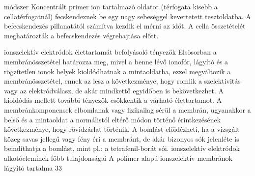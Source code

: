 {{ módszer
Koncentrált primer ion tartalmazó oldatot (térfogata kisebb a cellatérfogatnál) fecskendeznek be egy nagy sebeséggel kevertetett tesztoldatba. A befecskendezés pillanatától számítva kezdik el mérni az időt. A cella összetételét meghatározták a befecskendezés végrehajtása előtt. 

\sectioneAz ionszelektív elektródok élettartamát befolyásoló tényezők
Elsősorban a membránösszetétel határozza meg, mivel a benne lévő ionofór, lágyító és a rögzítetlen ionok helyek kioldódhatnak a mintaoldatba, ezzel megváltozik a membránösszetétel, ennek az lesz a következménye, hogy romlik a szelektivitás vagy az elektródválasz, de akár mindkettő egyidőben is bekövetkezhet. A kioldódás mellett további tényezők csökkentik a várható élettartamot. A membránkomponensek elbomlanak vagy fizikailag sérül a membrán, ugyanakkor a belső és a mintaoldat a normálistól eltérő módon történő érintkezésének következménye, hogy rövidzárlat történik. A bomlást előidézheti, ha a vizsgált közeg savas jellegű vagy fény éri a membránt, de akár bizonyos sók jelenléte is beindíthatja a bomlást, mint pl.: a tetrafenil-borát sói. 
\sectionAz ionszelektív elektródok alkotóeleminek főbb tulajdonságai
A polimer alapú ionszelektív membránok lágyító tartalma 33%
}}

